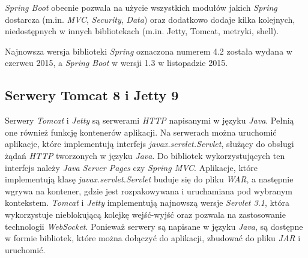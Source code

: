 \textsl{Spring Boot} obecnie pozwala na użycie wszystkich modułów jakich \textsl{Spring} dostarcza (m.in. \textsl{MVC}, \textsl{Security}, \textsl{Data}) oraz dodatkowo dodaje kilka kolejnych, niedostępnych w innych bibliotekach (m.in. Jetty, Tomcat, metryki, shell). 

Najnowsza wersja biblioteki \textsl{Spring} oznaczona numerem 4.2 została wydana w czerwcu 2015, a \textsl{Spring Boot} w wersji 1.3 w listopadzie 2015.

\subsection{Serwery Tomcat 8 i Jetty 9} 
Serwery \textsl{Tomcat} i \textsl{Jetty} są serwerami \textsl{HTTP} napisanymi w języku \textsl{Java}. Pełnią one również funkcję kontenerów aplikacji. Na serwerach można uruchomić aplikacje, które implementują interfejs \textsl{javax.servlet.Servlet}, służący do obsługi żądań \textsl{HTTP} tworzonych w języku \textsl{Java}. Do bibliotek wykorzystujących ten interfejs należy \textsl{Java Server Pages} czy \textsl{Spring MVC}. Aplikacje, które implementują klasę \textsl{javax.servlet.Servlet} buduje się do pliku \textsl{WAR}, a następnie wgrywa na kontener, gdzie jest rozpakowywana i uruchamiana pod wybranym kontekstem. \textsl{Tomcat} i \textsl{Jetty} implementują najnowszą wersje \textsl{Servlet 3.1}, która wykorzystuje nieblokującą kolejkę wejść-wyjść oraz pozwala na zastosowanie technologii \textsl{WebSocket}. Ponieważ serwery są napisane w języku \textsl{Java}, są dostępne w formie bibliotek, które można dołączyć do aplikacji, zbudować do pliku \textsl{JAR} i uruchomić.
